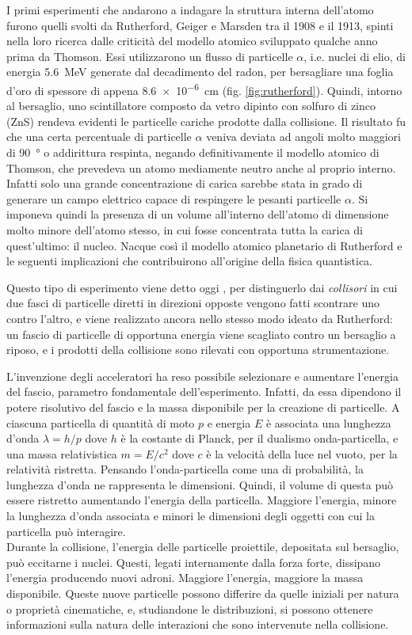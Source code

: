 \documentclass[../main.tex]{subfiles}
\begin{document}
I primi esperimenti che andarono a indagare la struttura interna dell'atomo furono quelli svolti da Rutherford, Geiger e Marsden tra il 1908 e il 1913, spinti nella loro ricerca dalle criticità del modello atomico sviluppato qualche anno prima da Thomson. Essi utilizzarono un flusso di particelle $\alpha$, i.e. nuclei di elio, di energia \SI{5.6}{\MeV} generate dal decadimento del radon, per bersagliare una foglia d'oro di spessore di appena \SI{8.6e-6}{\cm} (fig. \ref{fig:rutherford}). Quindi, intorno al bersaglio, uno scintillatore composto da vetro dipinto con solfuro di zinco (ZnS) rendeva evidenti le particelle cariche prodotte dalla collisione. Il risultato fu che una certa percentuale di particelle $\alpha$ veniva deviata ad angoli molto maggiori di \SI{90}{°} o addirittura respinta, negando definitivamente il modello atomico di Thomson, che prevedeva un atomo mediamente neutro anche al proprio interno. Infatti solo una grande concentrazione di carica sarebbe stata in grado di generare un campo elettrico capace di respingere le pesanti particelle $\alpha$. Si imponeva quindi la presenza di un volume all'interno dell'atomo di dimensione molto minore dell'atomo stesso, in cui fosse concentrata tutta la carica di quest'ultimo: il nucleo. Nacque così il modello atomico planetario di Rutherford e le seguenti implicazioni che contribuirono all'origine della fisica quantistica.

Questo tipo di esperimento viene detto oggi , per distinguerlo dai \emph{collisori} in cui due fasci di particelle diretti in direzioni opposte vengono fatti scontrare uno contro l'altro, e viene realizzato ancora nello stesso modo ideato da Rutherford: un fascio di particelle di opportuna energia viene scagliato contro un bersaglio a riposo, e i prodotti della collisione sono rilevati con opportuna strumentazione.

L'invenzione degli acceleratori ha reso possibile selezionare e aumentare l'energia del fascio, parametro fondamentale dell'esperimento.
Infatti, da essa dipendono il potere risolutivo del fascio e la massa disponibile per la creazione di particelle.
A ciascuna particella di quantità di moto $p$ e energia $E$ è associata una lunghezza d'onda $\lambda = h / p $ dove $h$ è la costante di Planck, per il dualismo onda-particella, e una massa relativistica $m = E / c^2$ dove $c$ è la velocità della luce nel vuoto, per la relatività ristretta. 
Pensando l'onda-particella come una  di probabilità, la lunghezza d'onda ne rappresenta le dimensioni. Quindi, il volume di questa  può essere ristretto aumentando l'energia della particella. Maggiore l'energia, minore la lunghezza d'onda associata e minori le dimensioni degli oggetti con cui la particella può interagire. \\ Durante la collisione, l'energia delle particelle proiettile, depositata sul bersaglio, può eccitarne i nuclei. Questi, legati internamente dalla forza forte, dissipano l'energia producendo nuovi adroni. Maggiore l'energia, maggiore la massa disponibile.
Queste nuove particelle possono differire da quelle iniziali per natura o proprietà cinematiche, e, studiandone le distribuzioni, si possono ottenere informazioni sulla natura delle interazioni che sono intervenute nella collisione.
\end{document}
